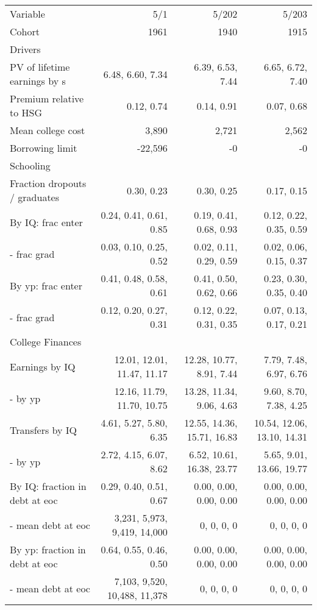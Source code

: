 \begin{tabular}{lrrr}
\hline
Variable & 5/1  & 5/202  & 5/203  \\
Cohort & 1961  & 1940  & 1915  \\
Drivers &   &   &   \\
PV of lifetime earnings by s & 6.48, 6.60, 7.34  & 6.39, 6.53, 7.44  & 6.65, 6.72, 7.40  \\
Premium relative to HSG & 0.12, 0.74  & 0.14, 0.91  & 0.07, 0.68  \\
Mean college cost & 3,890  & 2,721  & 2,562  \\
Borrowing limit & -22,596  & -0  & -0  \\
\hline
Schooling &   &   &   \\
Fraction dropouts / graduates & 0.30, 0.23  & 0.30, 0.25  & 0.17, 0.15  \\
By IQ: frac enter & 0.24, 0.41, 0.61, 0.85  & 0.19, 0.41, 0.68, 0.93  & 0.12, 0.22, 0.35, 0.59  \\
- frac grad & 0.03, 0.10, 0.25, 0.52  & 0.02, 0.11, 0.29, 0.59  & 0.02, 0.06, 0.15, 0.37  \\
By yp: frac enter & 0.41, 0.48, 0.58, 0.61  & 0.41, 0.50, 0.62, 0.66  & 0.23, 0.30, 0.35, 0.40  \\
- frac grad & 0.12, 0.20, 0.27, 0.31  & 0.12, 0.22, 0.31, 0.35  & 0.07, 0.13, 0.17, 0.21  \\
\hline
College Finances &   &   &   \\
Earnings by IQ & 12.01, 12.01, 11.47, 11.17  & 12.28, 10.77, 8.91, 7.44  & 7.79, 7.48, 6.97, 6.76  \\
- by yp & 12.16, 11.79, 11.70, 10.75  & 13.28, 11.34, 9.06, 4.63  & 9.60, 8.70, 7.38, 4.25  \\
Transfers by IQ & 4.61, 5.27, 5.80, 6.35  & 12.55, 14.36, 15.71, 16.83  & 10.54, 12.06, 13.10, 14.31  \\
- by yp & 2.72, 4.15, 6.07, 8.62  & 6.52, 10.61, 16.38, 23.77  & 5.65, 9.01, 13.66, 19.77  \\
By IQ: fraction in debt at eoc & 0.29, 0.40, 0.51, 0.67  & 0.00, 0.00, 0.00, 0.00  & 0.00, 0.00, 0.00, 0.00  \\
- mean debt at eoc & 3,231, 5,973, 9,419, 14,000  & 0, 0, 0, 0  & 0, 0, 0, 0  \\
By yp: fraction in debt at eoc & 0.64, 0.55, 0.46, 0.50  & 0.00, 0.00, 0.00, 0.00  & 0.00, 0.00, 0.00, 0.00  \\
- mean debt at eoc & 7,103, 9,520, 10,488, 11,378  & 0, 0, 0, 0  & 0, 0, 0, 0  \\
\hline
\end{tabular}%
